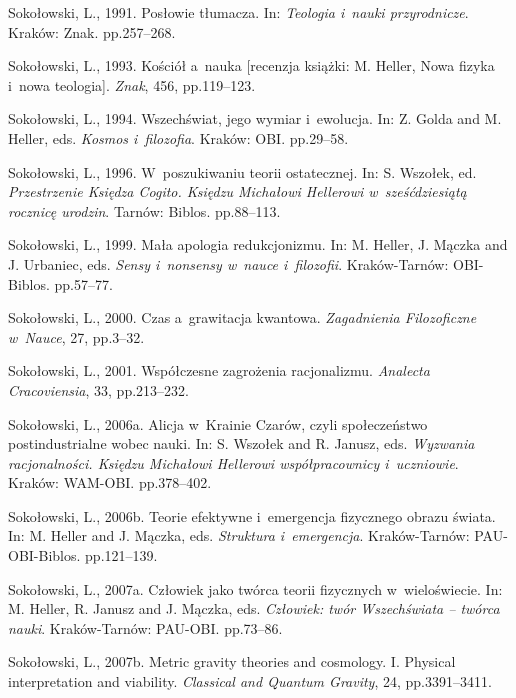 Sokołowski, L., 1991. Posłowie tłumacza. In: \textit{Teologia i~nauki przyrodnicze}. Kraków: Znak. pp.257–268.



Sokołowski, L., 1993. Kościół a~nauka [recenzja książki: M. Heller, Nowa fizyka i~nowa teologia]. \textit{Znak}, 456, pp.119–123.



Sokołowski, L., 1994. Wszechświat, jego wymiar i~ewolucja. In: Z. Golda and M. Heller, eds. \textit{Kosmos i~filozofia}. Kraków: OBI. pp.29–58.



Sokołowski, L., 1996. W~poszukiwaniu teorii ostatecznej. In: S. Wszołek, ed. \textit{Przestrzenie Księdza Cogito. Księdzu Michałowi Hellerowi w~sześćdziesiątą rocznicę urodzin}. Tarnów: Biblos. pp.88–113.



Sokołowski, L., 1999. Mała apologia redukcjonizmu. In: M. Heller, J. Mączka and J. Urbaniec, eds. \textit{Sensy i~nonsensy w~nauce i~filozofii}. Kraków-Tarnów: OBI-Biblos. pp.57–77.



Sokołowski, L., 2000. Czas a~grawitacja kwantowa. \textit{Zagadnienia Filozoficzne w~Nauce}, 27, pp.3–32.



Sokołowski, L., 2001. Współczesne zagrożenia racjonalizmu. \textit{Analecta Cracoviensia}, 33, pp.213–232.



Sokołowski, L., 2006a. Alicja w~Krainie Czarów, czyli społeczeństwo postindustrialne wobec nauki. In: S. Wszołek and R. Janusz, eds. \textit{Wyzwania racjonalności. Księdzu Michałowi Hellerowi współpracownicy i~uczniowie}. Kraków: WAM-OBI. pp.378–402.



Sokołowski, L., 2006b. Teorie efektywne i~emergencja fizycznego obrazu świata. In: M. Heller and J. Mączka, eds. \textit{Struktura i~emergencja}. Kraków-Tarnów: PAU-OBI-Biblos. pp.121–139.



Sokołowski, L., 2007a. Człowiek jako twórca teorii fizycznych w~wieloświecie. In: M. Heller, R. Janusz and J. Mączka, eds. \textit{Człowiek: twór Wszechświata -- twórca nauki}. Kraków-Tarnów: PAU-OBI. pp.73–86.



Sokołowski, L., 2007b. Metric gravity theories and cosmology. I. Physical interpretation and viability. \textit{Classical and Quantum Gravity}, 24, pp.3391–3411.



